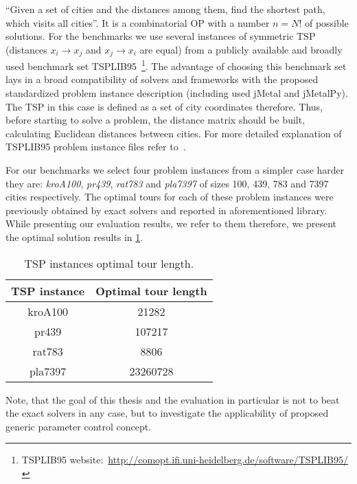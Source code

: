 ``Given a set of cities and the distances among them, find the shortest path, which visits all cities''. It is a combinatorial OP with a number $n = N!$ of possible solutions. For the benchmarks we use several instances of symmetric TSP (distances $x_i \rightarrow x_j$ and $x_j \rightarrow x_i$ are equal) from a publicly available and broadly used benchmark set TSPLIB95~\footnote{TSPLIB95 website:~\url{http://comopt.ifi.uni-heidelberg.de/software/TSPLIB95/}}. The advantage of choosing this benchmark set lays in a broad compatibility of solvers and frameworks with the proposed standardized problem instance description (including used jMetal and jMetalPy). The TSP in this case is defined as a set of city coordinates therefore. Thus, before starting to solve a problem, the distance matrix should be built, calculating Euclidean distances between cities. For more detailed explanation of TSPLIB95 problem instance files refer to~\cite{reinelt1995tsplib95}.

For our benchmarks we select four problem instances from a simpler case harder they are: \emph{kroA100}, \emph{pr439}, \emph{rat783} and \emph{pla7397} of sizes 100, 439, 783 and 7397 cities respectively. The optimal tours for each of these problem instances were previously obtained by exact solvers and reported in aforementioned library. While presenting our evaluation results, we refer to them therefore, we present the optimal solution results in \cref{eval:table:tsp optimal tour length}.

\begin{table}[h!]
	\centering
	\begin{tabular}{c||c}
		\textbf{TSP instance} & \textbf{Optimal tour length} \\
		\hline
		\hline
		kroA100 & 21282 \\
		pr439 & 107217 \\
		rat783 & 8806 \\
		pla7397 & 23260728 \\
	\end{tabular}
	\caption{TSP instances optimal tour length.}
	\label{eval:table:tsp optimal tour length}
\end{table}

Note, that the goal of this thesis and the evaluation in particular is not to beat the exact solvers in any case, but to investigate the applicability of proposed generic parameter control concept.

